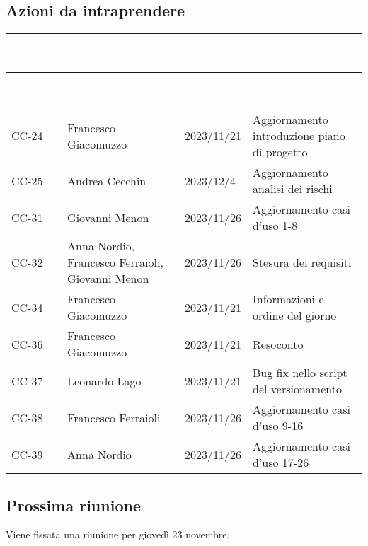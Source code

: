 \subsection{Azioni da intraprendere}
{
    \setlength{\tabcolsep}{10pt} 
    \renewcommand{\arraystretch}{1.5}
    \begin{xltabular}{\textwidth}{| l | X | X | X |}
         \hline
         \textbf{\textcolor{white}{Codice issue}} & \textbf{\textcolor{white}{Assegnatario}} & \textbf{\textcolor{white}{Scadenza}} & \textbf{\textcolor{white}{Descrizione}} \\
         \endfirsthead
         \hline
         \textbf{\textcolor{white}{Codice issue}} & \textbf{\textcolor{white}{Assegnatario}} & \textbf{\textcolor{white}{Scadenza}} & \textbf{\textcolor{white}{Descrizione}} \\
         \endhead
         \hline
         CC-24 & Francesco Giacomuzzo & 2023/11/21 & Aggiornamento introduzione piano di progetto \\
         \hline
         CC-25 & Andrea Cecchin & 2023/12/4 & Aggiornamento analisi dei rischi \\

         \hline
         CC-31 & Giovanni Menon & 2023/11/26 &  Aggiornamento casi d'uso 1-8 \\
         \hline
         CC-32 & Anna Nordio, Francesco Ferraioli, Giovanni Menon & 2023/11/26 & Stesura dei requisiti \\
         \hline
         CC-34 & Francesco Giacomuzzo & 2023/11/21 & Informazioni e ordine del giorno \\
         \hline
         CC-36 & Francesco Giacomuzzo & 2023/11/21 & Resoconto \\
         \hline
         CC-37 & Leonardo Lago & 2023/11/21 & Bug fix nello script del versionamento \\
         \hline
         CC-38 & Francesco Ferraioli & 2023/11/26 &  Aggiornamento casi d'uso 9-16\\
         \hline
         CC-39 & Anna Nordio & 2023/11/26 &  Aggiornamento casi d'uso 17-26    \\
         \hline
    \end{xltabular}
}


\subsection{Prossima riunione} \label{subsec:riunione}
Viene fissata una riunione per giovedì 23 novembre.